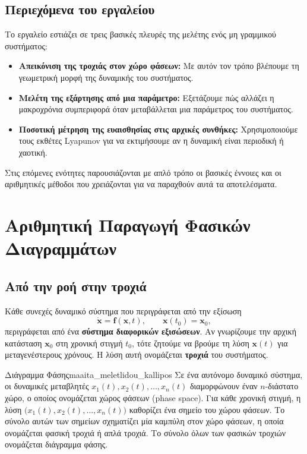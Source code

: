 \documentclass[11pt,a4paper]{report}
\begin{document}
\subsection{Περιεχόμενα του εργαλείου}
Το εργαλείο εστιάζει σε τρεις βασικές πλευρές της μελέτης ενός μη γραμμικού
συστήματος:
\begin{itemize}
\item \textbf{Απεικόνιση της τροχιάς στον χώρο φάσεων:} Με αυτόν τον τρόπο
βλέπουμε τη γεωμετρική μορφή της δυναμικής του συστήματος.
\item \textbf{Μελέτη της εξάρτησης από μια παράμετρο:} Εξετάζουμε πώς αλλάζει
η μακροχρόνια συμπεριφορά όταν μεταβάλλεται μια παράμετρος του συστήματος.
\item \textbf{Ποσοτική μέτρηση της ευαισθησίας στις αρχικές συνθήκες:}
Χρησιμοποιούμε τους εκθέτες Lyapunov για να εκτιμήσουμε αν η δυναμική είναι
περιοδική ή χαοτική.
\end{itemize}

Στις επόμενες ενότητες παρουσιάζονται με απλό τρόπο οι βασικές έννοιες και οι
αριθμητικές μέθοδοι που χρειάζονται για να παραχθούν αυτά τα αποτελέσματα.

\section{Αριθμητική Παραγωγή Φασικών Διαγραμμάτων}
\label{sec:numerical-phase-portraits}

\subsection{Από την ροή στην τροχιά}
\label{subsec:flow-to-trajectory}

Κάθε συνεχές δυναμικό σύστημα που περιγράφεται από την εξίσωση 
\begin{equation}
\dot{\mathbf{x}} = \mathbf{f}(\mathbf{x},t), \qquad \mathbf{x}(t_0)=\mathbf{x}_0,
\end{equation}
περιγράφεται από ένα \textbf{σύστημα διαφορικών εξισώσεων}. Αν γνωρίζουμε την αρχική
κατάσταση $\mathbf{x}_0$ στη χρονική στιγμή $t_0$, τότε ζητούμε να βρούμε τη
λύση $\mathbf{x}(t)$ για μεταγενέστερους χρόνους. Η λύση αυτή ονομάζεται
\textbf{τροχιά} του συστήματος.

\begin{definitionbox}{Διάγραμμα Φάσης}{maaita_meletlidou_kallipos}
  Σε ένα αυτόνομο δυναμικό σύστημα, οι δυναμικές μεταβλητές
  $x_1(t), x_2(t), \dots, x_n(t)$ διαμορφώνουν έναν $n$-διάστατο χώρο, ο οποίος
  ονομάζεται χώρος φάσεων (\foreignlanguage{english}{phase space}). Για κάθε χρονική
  στιγμή, η λύση $\bigl(x_1(t), x_2(t), \dots, x_n(t)\bigr)$ καθορίζει ένα σημείο
  του χώρου φάσεων. Το σύνολο αυτών των σημείων σχηματίζει μία καμπύλη στον χώρο
  φάσεων, η οποία ονομάζεται φασική τροχιά ή απλά τροχιά. Το σύνολο όλων των
  φασικών τροχιών ονομάζεται διάγραμμα φάσης.
\end{definitionbox}
\end{document}
